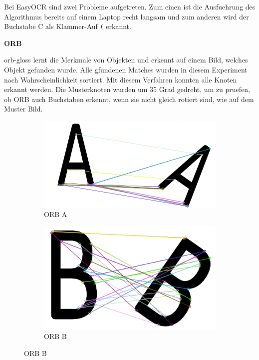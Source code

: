 Bei EasyOCR sind zwei Probleme aufgetreten. Zum einen ist die Ausfuehrung des Algorithmus bereits auf einem Laptop recht langsam und zum anderen wird der Buchstabe C als Klammer-Auf \verb|(| erkannt.

\textbf{ORB}

\gls{orb-gloss} lernt die Merkmale von Objekten und erkennt auf einem Bild, welches Objekt gefunden wurde. Alle gfundenen Matches wurden in diesem Experiment nach Wahrscheinlichkeit sortiert. Mit diesem Verfahren konnten alle Knoten erkannt werden. Die Musterknoten wurden um 35 Grad gedreht, um zu pruefen, ob ORB auch Buchstaben erkennt, wenn sie nicht gleich rotiert sind, wie auf dem Muster Bild.

\begin{figure}[H]
\begin{subfigure}{0.3\textwidth}
\includegraphics[width=0.95\linewidth]{assets/informatik-prototyp/opencv/target_node_detection/orb-a.png} 
\caption{ORB A}
\label{fig:orb-a}
\end{subfigure}
\begin{subfigure}{0.3\textwidth}
\includegraphics[width=0.95\linewidth]{assets/informatik-prototyp/opencv/target_node_detection/orb-b.png} 
\caption{ORB B}

\end{subfigure}
\end{figure}
